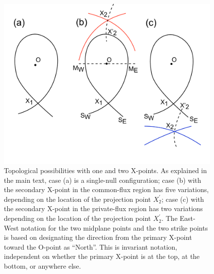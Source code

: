 \newpage

\begin{figure}[H]
    \centering
    \includegraphics[width=\linewidth]{figures/all_conf.pdf}

    \caption{Topological possibilities with one and two X-points. As
    explained in the main text, case (a) is a single-null
    configuration; case (b) with the secondary X-point in the
    common-flux region has five variations, depending on the location
    of the projection point $X_2^{\prime}$; case (c) with the
    secondary X-point in the private-flux region has two variations
    depending on the location of the projection point $X_2^{\prime}$.
    The East-West notation for the two midplane points and the two
    strike points is based on designating the direction from the
    primary X-point toward the O-point as ``North''. This is invariant
    notation, independent on whether the primary X-point is at the
    top, at the bottom, or anywhere else.}

    \label{fig:all_conf}
\end{figure}


